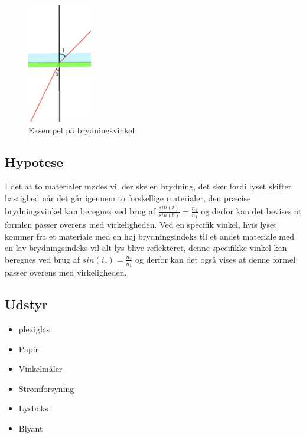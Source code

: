 \begin{figure}[h!]
    \centering
    \includegraphics[width=0.25\textwidth]{figures/brydningsvinkeleksempel.png}
    \caption{Eksempel på brydningsvinkel}
\end{figure}
\subsection{Hypotese}
I det at to materialer mødes vil der ske en brydning, det sker fordi lyset skifter hastighed når det går igennem to forskellige materialer, den præcise brydningsvinkel kan beregnes ved brug af \begin{math}\frac{sin(i)}{sin(b)} = \frac{n_{2}}{n_{1}}\end{math} og derfor kan det bevises at formlen passer overens med virkeligheden.\newline
Ved en specifik vinkel, hvis lyset kommer fra et materiale med en høj brydningsindeks til et andet materiale med en lav brydningsindeks vil alt lys blive reflekteret, denne specifikke vinkel kan beregnes ved brug af \begin{math}sin(i_{c}) = \frac{n_{2}}{n_{1}}\end{math} og derfor kan det også vises at denne formel passer overens med virkeligheden.

\subsection{Udstyr}
\begin{itemize}
    \item plexiglas
    \item Papir
    \item Vinkelmåler
    \item Strømforsyning
    \item Lysboks
    \item Blyant
\end{itemize}

